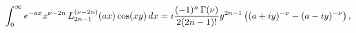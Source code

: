 \[\int_{0}^{\infty}e^{-ax}x^{\nu-2n}\mathop{L^{(\nu-2n)}_{2n-1}\/}\nolimits\!%
\left(ax\right)\mathop{\cos\/}\nolimits\!\left(xy\right)dx=i\frac{(-1)^{n}%
\mathop{\Gamma\/}\nolimits\!\left(\nu\right)}{2(2n-1)!}y^{2n-1}\left((a+iy)^{-%
\nu}-(a-iy)^{-\nu}\right),\]